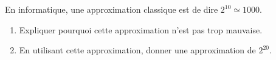 
\begin{exercice}\label{exo2smath-0201}

    En informatique, une approximation classique est de dire \( 2^{10} \simeq 1000\).
\begin{enumerate}
    \item
        Expliquer pourquoi cette approximation n'est pas trop mauvaise.
    \item
        En utilisant cette approximation, donner une approximation de \( 2^{20}\).
\end{enumerate}

\end{exercice}
